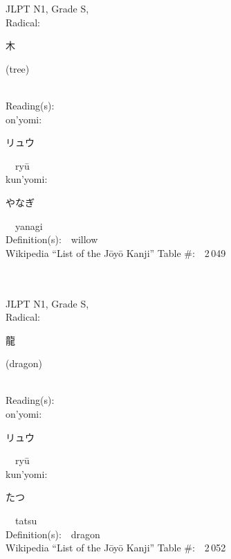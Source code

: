\begin{multicols}{2}
{JLPT N1, Grade S, \\Radical:\ \ {\begin{CJK}{UTF8}{min} 木 \end{CJK}} (tree) } \\
Reading(s):\ \ \\
{\hspace*{1em}}on'yomi:\ \ \\
{\hspace*{2em}}{\begin{CJK}{UTF8}{min} リュウ \end{CJK}}\ \ ry\=u\ \ \\
{\hspace*{1em}}kun'yomi:\ \ \\
{\hspace*{2em}}{\begin{CJK}{UTF8}{min} やなぎ \end{CJK}}\ \ yanagi\ \ \\
Definition(s):\ \ willow \\
Wikipedia ``List of the J\=oy\=o Kanji'' Table \#:\ \ 2\,049 \\
\ \ \\
{\fontsize{34pt}{40pt}  }\ \ \\
{JLPT N1, Grade S, \\Radical:\ \ {\begin{CJK}{UTF8}{min} 龍 \end{CJK}} (dragon) } \\
Reading(s):\ \ \\
{\hspace*{1em}}on'yomi:\ \ \\
{\hspace*{2em}}{\begin{CJK}{UTF8}{min} リュウ \end{CJK}}\ \ ry\=u\ \ \\
{\hspace*{1em}}kun'yomi:\ \ \\
{\hspace*{2em}}{\begin{CJK}{UTF8}{min} たつ \end{CJK}}\ \ tatsu\ \ \\
Definition(s):\ \ dragon \\
Wikipedia ``List of the J\=oy\=o Kanji'' Table \#:\ \ 2\,052 \\
\ \ \\

\end{multicols}
